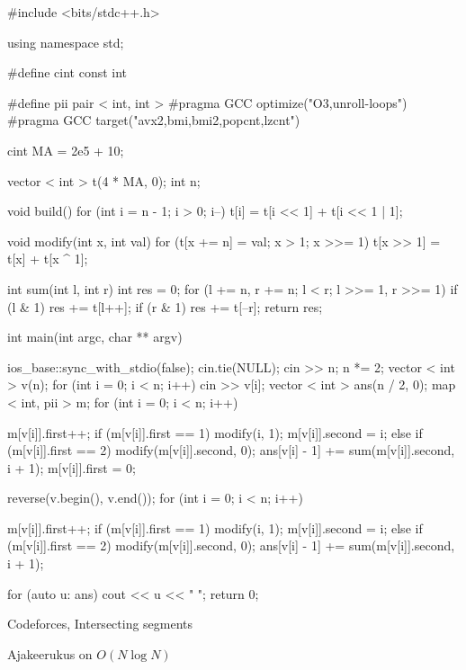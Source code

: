 \documentclass{trkut}
\theoremstyle{definition}
\begin{document}
\begin{cclol}
#include <bits/stdc++.h>

using namespace std;

#define cint
const int

#define pii pair < int, int >
#pragma GCC optimize("O3,unroll-loops")
#pragma GCC target("avx2,bmi,bmi2,popcnt,lzcnt")

cint MA = 2e5 + 10;

vector < int > t(4 * MA, 0);
int n;

void build() {
  for (int i = n - 1; i > 0; i--) {
    t[i] = t[i << 1] + t[i << 1 | 1];
  }
}

void modify(int x, int val) {
  for (t[x += n] = val; x > 1; x >>= 1) t[x >> 1] = t[x] + t[x ^ 1];
}

int sum(int l, int r) {
  int res = 0;
  for (l += n, r += n; l < r; l >>= 1, r >>= 1) {
    if (l & 1) res += t[l++];
    if (r & 1) res += t[--r];
  }
  return res;
}

int main(int argc, char ** argv) {
  ios_base::sync_with_stdio(false);
  cin.tie(NULL);
  cin >> n;
  n *= 2;
  vector < int > v(n);
  for (int i = 0; i < n; i++) cin >> v[i];
  vector < int > ans(n / 2, 0);
  map < int, pii > m;
  for (int i = 0; i < n; i++) {
    m[v[i]].first++;
    if (m[v[i]].first == 1) {
      modify(i, 1);
      m[v[i]].second = i;
    } else if (m[v[i]].first == 2) {
      modify(m[v[i]].second, 0);
      ans[v[i] - 1] += sum(m[v[i]].second, i + 1);
      m[v[i]].first = 0;
    }

  }
  reverse(v.begin(), v.end());
  for (int i = 0; i < n; i++) {
    m[v[i]].first++;
    if (m[v[i]].first == 1) {
      modify(i, 1);
      m[v[i]].second = i;
    } else if (m[v[i]].first == 2) {
      modify(m[v[i]].second, 0);
      ans[v[i] - 1] += sum(m[v[i]].second, i + 1);
    }

  }

  for (auto u: ans) {
    cout << u << " ";
  }
  return 0;
}
    \end{cclol}
    \begin{kk}[H]
    \caption{Codeforces, Intersecting segments}%
    \end{kk}
Ajakeerukus on $O(N\log N)$
\end{document}
